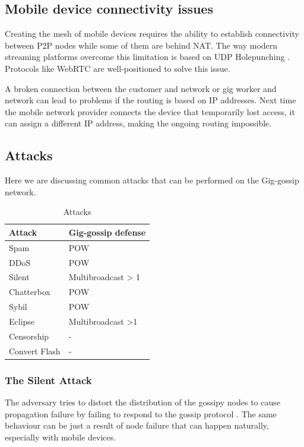 \documentclass{article}
\begin{document}
\subsection{Mobile device connectivity issues}

Creating the mesh of mobile devices requires the ability to establish connectivity between P2P nodes while some of them are behind NAT. The way modern streaming platforms overcome this limitation is based on UDP Holepunching \cite{HolePunching}. Protocols like WebRTC \cite{WebRTC} are well-positioned to solve this issue.

A broken connection between the customer and network or gig worker and network can lead to problems if the routing is based on IP addresses. Next time the mobile network provider connects the device that temporarily lost access, it can assign a different IP address, making the ongoing routing impossible.

\subsection{Attacks}
Here we are discussing common attacks that can be performed on the Gig-gossip network.


\begin{table}  
	\centering
	\begin{tabular}{ll}
		\toprule
		Attack         & Gig-gossip defense \\
		\midrule
		Spam           & POW \\
		DDoS           & POW \\
		Silent         & Multibroadcast > 1 \\
		Chatterbox     & POW \\
		Sybil          & POW \\
		Eclipse        & Multibroadcast >1 \\
		Censorship     & - \\
		Convert Flash  & - \\
		\bottomrule
	\end{tabular}
	\label{tab:attacks}
	\caption{Attacks}
\end{table}


\subsubsection{The Silent Attack}
The adversary tries to distort the distribution of the gossipy nodes to cause propagation failure by failing to respond to the gossip protocol \cite{AdHocNet}. The same behaviour can be just a result of node failure that can happen naturally, especially with mobile devices.
\end{document}
